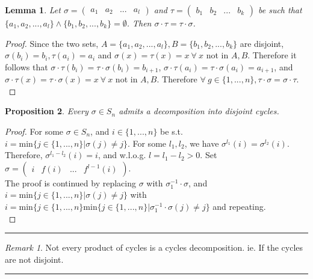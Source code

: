 \documentclass{article}
\newtheorem{theorem}{Proposition}[section]
\newtheorem{lemma}[theorem]{Lemma}
\theoremstyle{definition}
\theoremstyle{remark}
\newtheorem*{remark}{Remark}
\begin{document}
\begin{lemma}
	Let $\sigma=\begin{pmatrix}
			a_1 & a_2 & ... & a_l
		\end{pmatrix}$
	and $\tau = \begin{pmatrix}
			b_1 & b_2 & ... & b_k
		\end{pmatrix}$ be such that $\lbrace a_1,a_2,...,a_l\rbrace \wedge \lbrace b_1,b_2,...,b_k\rbrace = \emptyset$. Then $\sigma\cdot \tau=\tau\cdot\sigma$.\\
\end{lemma}
\begin{proof}
	Since the two sets, $A=\lbrace a_1,a_2,...,a_l\rbrace,B=\lbrace b_1,b_2,...,b_k\rbrace$ are disjoint, $\sigma(b_i)=b_i,\tau(a_i)=a_i$ and $\sigma(x)=\tau(x)=x~\forall~x$ not in $A,B$. Therefore it follows that $\sigma\cdot\tau(b_i)=\tau\cdot\sigma(b_i)=b_{i+1}$, $\sigma\cdot\tau(a_i)=\tau\cdot\sigma(a_i)=a_{i+1}$, and $\sigma\cdot\tau(x)=\tau\cdot\sigma(x)=x~\forall~x$ not in $A,B$. Therefore $\forall ~ g\in \lbrace 1,...,n\rbrace,\tau\cdot\sigma=\sigma\cdot\tau$.\\
\end{proof}

\begin{theorem}
	Every $\sigma \in S_n$ admits a decomposition into disjoint cycles.
\end{theorem}
\begin{proof}
	For some $\sigma\in S_n$, and $i\in\lbrace1,...,n\rbrace$ be s.t. $i=\mathrm{min}\lbrace j\in\lbrace1,...,n\rbrace|\sigma(j)\neq j\rbrace$. For some $l_1,l_2$, we have $\sigma^{l_1}(i)=\sigma^{l_2}(i)$. Therefore, $\sigma^{l_1-l_2}(i)=i$, and w.l.o.g. $l=l_1-l_2>0$. Set $\sigma=\begin{pmatrix}
			i & f(i) & ... & f^{l-1}(i)
		\end{pmatrix}$.\\
	The proof is continued by replacing $\sigma$ with $\sigma_1^{-1}\cdot\sigma$, and $i=\mathrm{min}\lbrace j \in\lbrace1,...,n\rbrace| \sigma(j)\neq j\rbrace$ with $i=\mathrm{min}\lbrace j\in \lbrace1,...,n\rbrace\mathrm{min}\lbrace j \in\lbrace1,...,n\rbrace|\sigma_1^{-1}\cdot\sigma(j)\neq j\rbrace$ and repeating.\\
\end{proof}
\hrule
\vspace{2mm}
\begin{remark}
	Not every product of cycles is a cycles decomposition. ie. If the cycles are not disjoint.\\
\end{remark}
\hrule
\newpage
\end{document}
